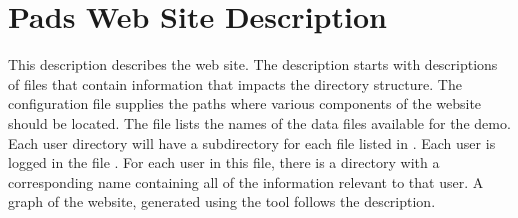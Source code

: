 \section{Pads Web Site Description}
This \forest{} description describes the \pads{} web site. The
description starts with \pads{} descriptions of files that contain
information that impacts the directory structure. The
configuration file supplies the paths where various components of the
website should be located.  The  file lists the names
of the data files available for the demo.  Each user directory will
have a subdirectory for each file listed in . Each
user is logged in the file .  For each user in this
file, there is a directory with a corresponding name containing all of
the information relevant to that user.  A graph
of the \pads{} website, generated using the  tool
follows the description.

\newpage
